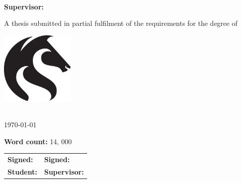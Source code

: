 
\begin{titlepage}
\makeatletter

	\vspace*{\fill}

	{
		\huge{\textbf{\textsf{\@title}}}
		\par
	}

	\vspace{0.25cm}\par
	\begin{center}
		\sffamily
		\LARGE{\textbf{\@author}} \\
		\vspace{0.05cm}\par
		\large{\textbf{Supervisor:} \supervisor}
	\end{center}
	\vspace{0.25cm}\par

	{
		\Large{A thesis submitted in partial fulfilment of the requirements for the degree of \degree}
		\par
	}

	\vspace{1cm}\par

	\begin{center}
		\includegraphics[height=3.5cm]{images/title/uon_logo}
		\vspace{1cm}\par
		\Large{\institute \\ \today}
	\end{center}

	\vspace*{\fill}

	\sffamily
	\textbf{Word count:} 14, 000
	\vspace{0.5cm}\par
	\begin{tabularx}{\textwidth}{@{}XX@{}}
		\textbf{Signed:} & \textbf{Signed:} \\
		\textbf{Student:} & \textbf{Supervisor:} \\
	\end{tabularx}

\makeatother
\end{titlepage}
